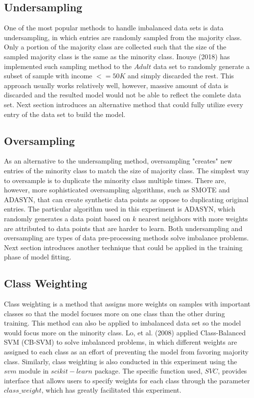 \documentclass{article}
\begin{document}
\subsection{Undersampling}
\label{undersampling}

One of the most popular methods to handle imbalanced data sets is data undersampling, in which entries are randomly sampled from the majority class. Only a portion of the majority class are collected such that the size of the sampled majority class is the same as the minority class. Inouye (2018) has implemented such sampling method to the $Adult$ data set to randomly generate a subset of sample with income $<=50K$ and simply discarded the rest. This approach usually works relatively well, however, massive amount of data is discarded and the resulted model would not be able to reflect the comlete data set. Next section introduces an alternative method that could fully utilize every entry of the data set to build the model.

\subsection{Oversampling}
\label{oversampling}

As an alternative to the undersampling method, oversampling "creates" new entries of the minority class to match the size of majority class. The simplest way to oversample is to duplicate the minority class multiple times. There are, however, more sophisticated oversampling algorithms, such as SMOTE and ADASYN, that can create synthetic data points as oppose to duplicating original entries. The particular algorithm used in this experiment is ADASYN, which randomly generates a data point based on $k$ nearest neighbors with more weights are attributed to data points that are harder to learn. Both undersampling and oversampling are types of data pre-processing methods solve imbalance problems. Next section introduces another technique that could be applied in the training phase of model fitting.

\subsection{Class Weighting}
\label{class_weighting}

Class weighting is a method that assigns more weights on samples with important classes so that the model focuses more on one class than the other during training. This method can also be applied to imbalanced data set so the model would focus more on the minority class. Lo, et al. (2008) applied Class-Balanced SVM (CB-SVM) to solve imbalanced problems, in which different weights are assigned to each class as an effort of preventing the model from favoring majority class. Similarly, class weighting is also conducted in this experiment using the $svm$ module in $scikit-learn$ package. The specific function used, $SVC$, provides interface that allows users to specify weights for each class through the parameter $class\_weight$, which has greatly facilitated this experiment.
\end{document}
